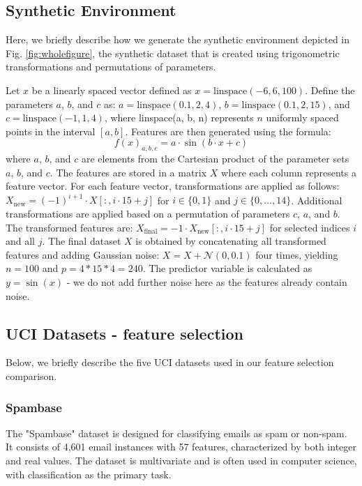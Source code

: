 \subsection{Synthetic Environment}
\label{sec:synthetic_env}
Here, we briefly describe how we generate the synthetic environment depicted in Fig. \ref{fig:wholefigure}, the synthetic dataset that is created using trigonometric transformations and permutations of parameters. 

Let $x$ be a linearly spaced vector defined as $x = \text{linspace}(-6, 6, 100)$. Define the parameters $a$, $b$, and $c$ as: $ a = \text{linspace}(0.1, 2, 4)$, $b = \text{linspace}(0.1, 2, 15)$, and $c = \text{linspace}(-1, 1, 4)$, where linspace(a, b, n) represents $n$ uniformly spaced points in the interval $[a,b]$.  Features are then generated using the formula: 
\begin{equation}
    f(x)_{a,b,c} = a \cdot \sin(b \cdot x + c)
\end{equation} 
where $a$, $b$, and $c$ are elements from the Cartesian product of the parameter sets $a$, $b$, and $c$. The features are stored in a matrix $X$ where each column represents a feature vector. For each feature vector, transformations are applied as follows: $X_{\text{new}} = (-1)^{i+1} \cdot X[:, i \cdot 15 + j]$
for $i \in \{0, 1\}$ and $j \in \{0, \ldots, 14\}$. Additional transformations are applied based on a permutation of parameters $c$, $a$, and $b$. The transformed features are: $X_{\text{final}} = -1 \cdot X_{\text{new}}[:, i \cdot 15 + j]$ for selected indices $i$ and all $j$. The final dataset $X$ is obtained by concatenating all transformed features and adding Gaussian noise: $X = X + \mathcal{N}(0, 0.1)$ four times, yielding $n=100$ and $p=4*15*4=240$. The predictor variable is calculated as $y=\sin(x)$ - we do not add further noise here as the features already contain noise.


\subsection{UCI Datasets - feature selection}

Below, we briefly describe the five UCI datasets \citep{uci2019} used in our feature selection comparison. 

\subsubsection{Spambase}

The "Spambase" dataset \citep{hopkins1999spambase} is designed for classifying emails as spam or non-spam. It consists of 4,601 email instances with 57 features, characterized by both integer and real values. The dataset is multivariate and is often used in computer science, with classification as the primary task.

